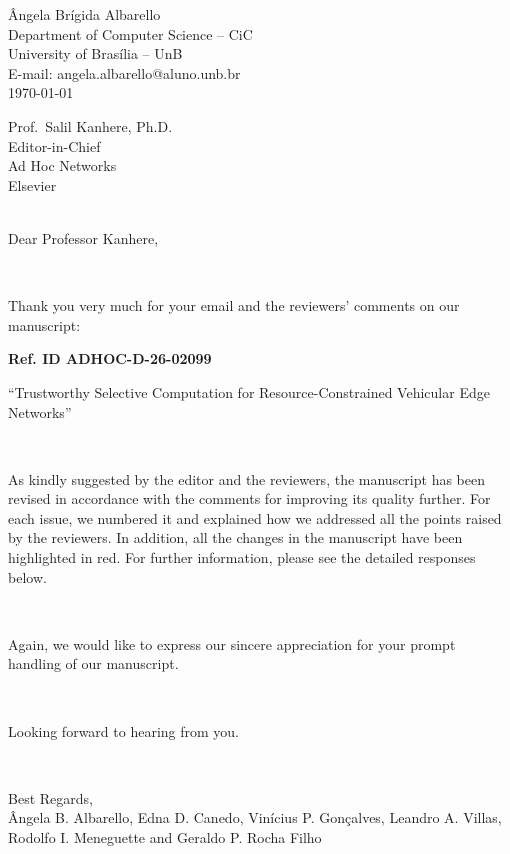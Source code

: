 \documentclass[1p,12pt,authoryear]{elsarticle}
\begin{document}
\begin{flushright}
\^Angela Br\'igida Albarello \\
Department of Computer Science -- CiC \\
University of Bras\'ilia -- UnB \\
E-mail: angela.albarello@aluno.unb.br \\
\today \\
\end{flushright}

\noindent Prof.\ Salil Kanhere, Ph.D. \\
\noindent Editor-in-Chief \\
\noindent Ad Hoc Networks \\
\noindent Elsevier \\

~

\noindent Dear Professor Kanhere,

~

\noindent Thank you very much for your email and the reviewers' comments on our manuscript:

\begin{center}
\textbf{Ref. ID ADHOC-D-26-02099}

``Trustworthy Selective Computation for Resource-Constrained Vehicular Edge Networks''
\end{center}

~

\noindent As kindly suggested by the editor and the reviewers, the manuscript has been revised in accordance with the comments for improving its quality further. For each issue, we numbered it and explained how we addressed all the points raised by the reviewers. In addition, all the changes in the manuscript have been highlighted in red. For further information, please see the detailed responses below.

~

\noindent Again, we would like to express our sincere appreciation for your prompt handling of our manuscript.

~

\noindent Looking forward to hearing from you.

~

\noindent Best Regards,\\
\noindent \^Angela B. Albarello, Edna D. Canedo, Vin\'icius P. Gon\c{c}alves, Leandro A. Villas, Rodolfo I. Meneguette and Geraldo P. Rocha Filho
\end{document}
